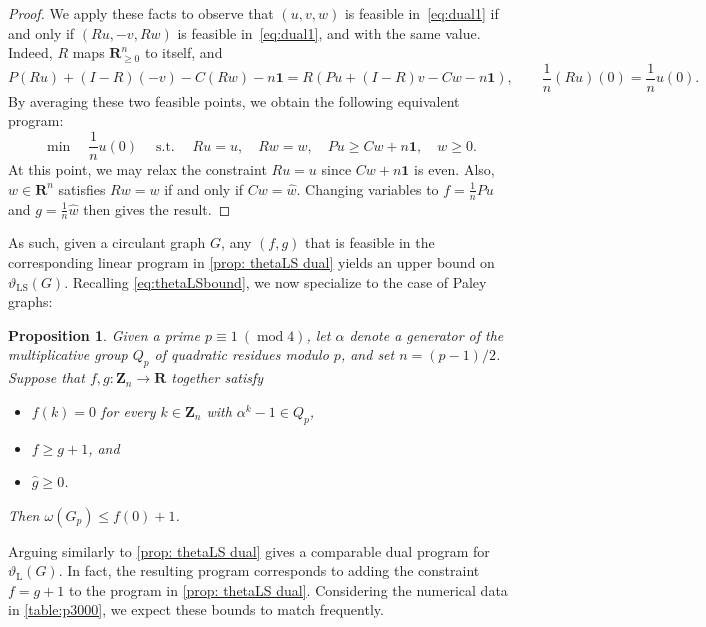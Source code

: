 \documentclass[]{spie}  %
\newtheorem{prop}[thm]{Proposition}
\begin{document}
\begin{proof}
We apply these facts to observe that $(u,v,w)$ is feasible in~\eqref{eq:dual1} if and only if $(Ru,-v,Rw)$ is feasible in~\eqref{eq:dual1}, and with the same value.
Indeed, $R$ maps $\mathbf{R}^n_{\geq 0}$ to itself, and
\[
P(Ru)+(I-R)(-v)-C(Rw)-n\mathbf{1}
= R(Pu + (I-R)v - Cw - n\mathbf{1}),
\qquad
\frac{1}{n}(Ru)(0)=\frac{1}{n}u(0).
\]
By averaging these two feasible points, we obtain the following equivalent program:
\begin{equation}\label{eq:dual2}
\operatorname{min}
\quad
\frac{1}{n} u(0)
\quad
\operatorname{s.t.}
\quad
Ru = u,
\quad
Rw = w,
\quad
Pu \geq Cw + n\mathbf{1},
\quad
w \geq0.
\end{equation}
At this point, we may relax the constraint $Ru = u$ since $Cw + n\mathbf{1}$ is even.
Also, $w\in\mathbf{R}^n$ satisfies $Rw = w$ if and only if $Cw = \widehat{w}$.
Changing variables to $f = \frac{1}{n} Pu$ and $g = \frac{1}{n}\widehat{w}$ then gives the result.
\end{proof}

As such, given a circulant graph $G$, any $(f,g)$ that is feasible in the corresponding linear program in \cref{prop: thetaLS dual} yields an upper bound on $\vartheta_{\operatorname{LS}}(G)$.
Recalling \eqref{eq:thetaLSbound}, we now specialize to the case of Paley graphs:

\begin{prop}\label{prop:paleylemma}
Given a prime $p \equiv 1~(\operatorname{mod}4)$, let $\alpha$ denote a generator of the multiplicative group $Q_p$ of quadratic residues modulo $p$, and set $n = (p - 1)/2$. Suppose that $f,g\colon \mathbf{Z}_n \rightarrow \mathbf{R}$ together satisfy
\begin{itemize}
\item[(i)]
$f(k) = 0$ for every $k \in \mathbf{Z}_n$ with $\alpha^k - 1 \in Q_p$,
\item[(ii)]
$f \geq g + 1$, and
\item[(iii)]
$\widehat{g} \geq 0$.
\end{itemize}
Then $\omega(G_p) \leq f(0) + 1$.
\end{prop}

Arguing similarly to \cref{prop: thetaLS dual} gives a comparable dual program for $\vartheta_{\operatorname{L}}(G)$.  In fact, the resulting program corresponds to adding the constraint $f = g + 1$ to the program in \cref{prop: thetaLS dual}.  Considering the numerical data in \cref{table:p3000}, we expect these bounds to match frequently.
\end{document}
